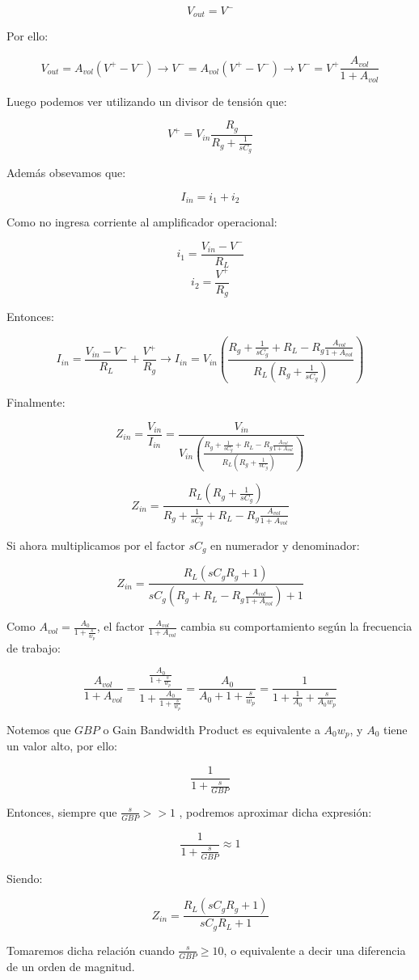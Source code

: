 $$V_{out}=V^-$$

Por ello:

$$V_{out}=A_{vol}(V^+-V^-) \longrightarrow V^-=A_{vol}(V^+-V^-) 
\longrightarrow V^-= V^+ \frac{A_{vol}}{1+A_{vol}}$$

Luego podemos ver utilizando un divisor de tensión que:

$$V^+= V_{in}\frac{R_g}{R_g+\frac{1}{sC_g}}$$

Además obsevamos que:

$$I_{in}=i_1+i_2$$

Como no ingresa corriente al amplificador operacional:

$$i_1=\frac{V_{in}-V^-}{R_L}$$
$$i_2=\frac{V^+}{R_g}$$

Entonces:

$$I_{in}=\frac{V_{in}-V^-}{R_L}+\frac{V^+}{R_g} \longrightarrow 
I_{in}=V_{in}(\frac{R_g+\frac{1}{sC_g}+R_L-R_g\frac{A_{vol}}{1+A_{vol}}}{R_L(R_g+\frac{1}{sC_g})})$$

Finalmente:

$$Z_{in}=\frac{V_{in}}{I_{in}}=\frac{V_{in}}{V_{in}(\frac{R_g+\frac{1}{sC_g}+R_L-R_g\frac{A_{vol}}{1+A_{vol}}}{R_L(R_g+\frac{1}{sC_g})})}$$

$$Z_{in}=\frac{R_L(R_g+\frac{1}{sC_g})}{R_g+\frac{1}{sC_g}+R_L-R_g\frac{A_{vol}}{1+A_{vol}}}$$

Si ahora multiplicamos por el factor $sC_g$ en numerador y denominador:

$$Z_{in}=\frac{R_L(sC_gR_g+1)}{sC_g(R_g+R_L-R_g\frac{A_{vol}}{1+A_{vol}})+1}$$

Como $A_{vol}=\frac{A_0}{1+\frac{s}{w_p}}$, el factor $\frac{A_{vol}}{1+A_{vol}}$ cambia su comportamiento
según la frecuencia de trabajo:

$$\frac{A_{vol}}{1+A_{vol}}=\frac{\frac{A_0}{1+\frac{s}{w_p}}}{1+\frac{A_0}{1+\frac{s}{w_p}}}=
\frac{A_0}{A_0+1+\frac{s}{w_p}}=\frac{1}{1+\frac{1}{A_0}+\frac{s}{A_0w_p}}$$

Notemos que $GBP$ o Gain Bandwidth Product es equivalente a $A_0w_p$, y $A_0$ tiene un valor alto, por ello:

$$\frac{1}{1+\frac{s}{GBP}}$$

Entonces, siempre que $\frac{s}{GBP} >> 1$ , podremos aproximar dicha expresión:

$$\frac{1}{1+\frac{s}{GBP}} \approx 1$$

Siendo:

$$Z_{in}=\frac{R_L(sC_gR_g+1)}{sC_gR_L+1}$$

Tomaremos dicha relación cuando $\frac{s}{GBP} \geq 10$, o equivalente a decir una diferencia de un orden de magnitud.

